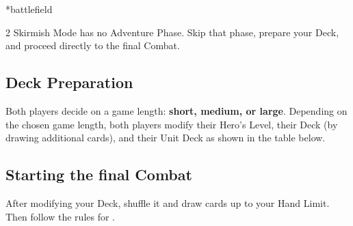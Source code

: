 \newpage
\begin{expansion}*{battlefield}
  \begin{multicols}{2}
    Skirmish Mode has no Adventure Phase.
    Skip that phase, prepare your Deck, and proceed directly to the final Combat.\par
    \vspace*{1em}
    \subsection*{Deck Preparation}
    Both players decide on a game length: \textbf{short, medium, or large}.
    Depending on the chosen game length, both players modify their Hero's Level, their Deck (by drawing additional cards), and their Unit Deck as shown in the table below.\par

    \vspace*{1em}
    \columnbreak
    \subsection*{Starting the final Combat}
    After modifying your Deck, shuffle it and draw cards up to your Hand Limit.
    Then follow the rules for .

    \vspace*{\fill}
  \end{multicols}


\end{expansion}
